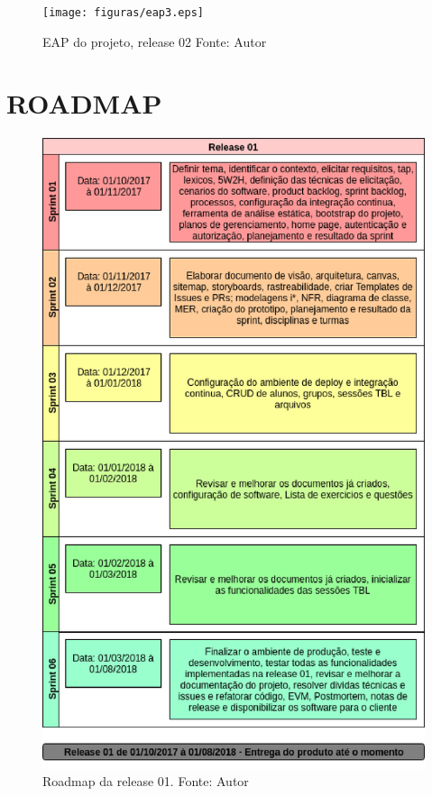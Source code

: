 \begin{apendicesenv}
\begin{figure}[h!]
	\centering
  \texttt{[image: figuras/eap3.eps]}
  \caption[EAP do projeto, release 02.]{EAP do projeto, release 02 Fonte: Autor}
	\label{fig:eap}
\end{figure}

\chapter{ROADMAP} \label{apendice:roadmap}

\begin{figure}[h!]
	\centering
  \includegraphics[keepaspectratio=true,scale=0.8]{figuras/roadmap1.eps}
  \caption[Roadmap da release 01.]{Roadmap da release 01. Fonte: Autor}
	\label{fig:roadmap1}
\end{figure}


\end{apendicesenv}
